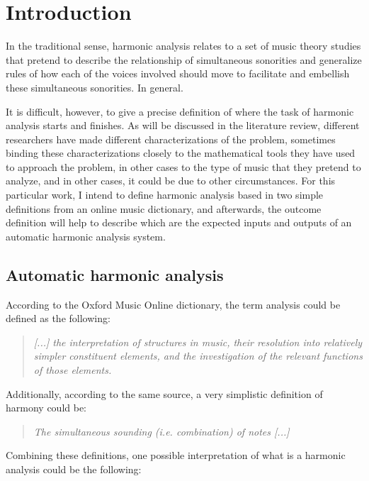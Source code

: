 \chapter{Introduction}
In the traditional sense, harmonic analysis relates to a set of music theory studies that pretend to describe the relationship of simultaneous sonorities and generalize rules of how each of the voices involved should move to facilitate and embellish these simultaneous sonorities. In general.

It is difficult, however, to give a precise definition of where the task of harmonic analysis starts and finishes. As will be discussed in the literature review, different researchers have made different characterizations of the problem, sometimes binding these characterizations closely to the mathematical tools they have used to approach the problem, in other cases to the type of music that they pretend to analyze, and in other cases, it could be due to other circumstances. For this particular work, I intend to define harmonic analysis based in two simple definitions from an online music dictionary, and afterwards, the outcome definition will help to describe which are the expected inputs and outputs of an automatic harmonic analysis system.

\section{Automatic harmonic analysis}
According to the Oxford Music Online dictionary, the term analysis could be defined as the following: \cite{oxfordanalysis}

\begin{quote}
\centering
\emph{[...] the interpretation of structures in music, \linebreak
their resolution into relatively simpler constituent elements, \linebreak and the investigation of the relevant functions of those elements.}
\end{quote}

Additionally, according to the same source, a very simplistic definition of harmony could be: \cite{oxfordharmony}

\begin{quote}
\centering
\emph{The simultaneous sounding (i.e. combination) of notes [...]}
\end{quote}

Combining these definitions, one possible interpretation of what is a harmonic analysis could be the following:

